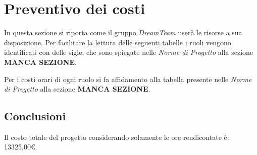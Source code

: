 \section{Preventivo dei costi}
In questa sezione si riporta come il gruppo \textit{DreamTeam} userà le risorse a sua disposizione.  Per facilitare la lettura delle seguenti tabelle i ruoli vengono identificati con delle sigle,  che sono spiegate nelle \textit{Norme di Progetto} alla sezione \textbf{MANCA SEZIONE}.

Per i costi orari di ogni ruolo si fa affidamento alla tabella presente nelle \textit{Norme di Progetto} alla sezione \textbf{MANCA SEZIONE}.







\subsection{Conclusioni}
Il costo totale del progetto considerando solamente le ore rendicontate è:  13325,00\euro .
